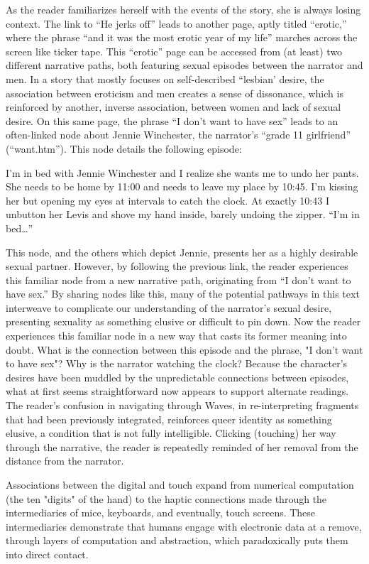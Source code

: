 \documentclass[11pt]{article}
\begin{document}
As the reader familiarizes herself with the events of the story, she
is always losing context. The link to “He jerks off” leads to another
page, aptly titled “erotic,” where the phrase “and it was the most
erotic year of my life” marches across the screen like ticker
tape. This “erotic” page can be accessed from (at least) two different
narrative paths, both featuring sexual episodes between the narrator
and men. In a story that mostly focuses on self-described “lesbian’
desire, the association between eroticism and men creates a sense of
dissonance, which is reinforced by another, inverse association,
between women and lack of sexual desire. On this same page, the phrase
“I don’t want to have sex” leads to an often-linked node about Jennie
Winchester, the narrator’s “grade 11 girlfriend” (“want.htm”). This
node details the following episode:
\begin{source}
I’m in bed with Jennie Winchester and I realize she wants me to undo
her pants. She needs to be home by 11:00 and needs to leave my place
by 10:45. I’m kissing her but opening my eyes at intervals to catch
the clock. At exactly 10:43 I unbutton her Levis and shove my hand
inside, barely undoing the zipper. “I’m in bed…”
\end{source}
This node, and the others which depict Jennie, presents her as a
highly desirable sexual partner. However, by following the previous
link, the reader experiences this familiar node from a new narrative
path, originating from “I don’t want to have sex.” By sharing nodes
like this, many of the potential pathways in this text interweave to
complicate our understanding of the narrator’s sexual desire,
presenting sexuality as something elusive or difficult to pin
down. Now the reader experiences this familiar node in a new way that
casts its former meaning into doubt. What is the connection between
this episode and the phrase, "I don't want to have sex"? Why is the
narrator watching the clock? Because the character's desires have been
muddled by the unpredictable connections between episodes, what at
first seems straightforward now appears to support alternate
readings. The reader’s confusion in navigating through Waves, in
re-interpreting fragments that had been previously integrated,
reinforces queer identity as something elusive, a condition that is
not fully intelligible. Clicking (touching) her way through the
narrative, the reader is repeatedly reminded of her removal from the
distance from the narrator.

Associations between the digital and touch expand from numerical
computation (the ten "digits" of the hand) to the haptic connections
made through the intermediaries of mice, keyboards, and eventually,
touch screens. These intermediaries demonstrate that humans engage
with electronic data at a remove, through layers of computation and
abstraction, which paradoxically puts them into direct contact. 
\end{document}
